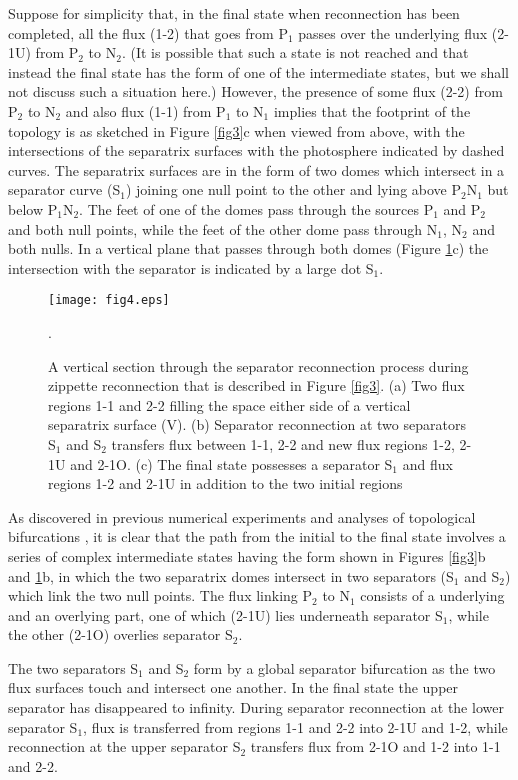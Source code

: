 \documentclass[10pt,namedreferneces]{SolarPhysics}
\begin{document}
\begin{article}
Suppose for simplicity that, in the final state when reconnection has been completed, all the flux (1-2) that goes from P$_1$ passes over the underlying flux (2-1U) from P$_2$ to N$_2$. (It is possible that such a state is not reached and that instead the final state has the form of one of the intermediate states, but we shall not discuss such a situation here.) However, the presence  of some flux (2-2) from P$_2$ to N$_2$ and also flux (1-1) from P$_1$ to N$_1$ implies that the footprint of the topology is as sketched in Figure \ref{fig3}c when viewed from above, with the intersections of the separatrix surfaces with the photosphere indicated by dashed curves. The separatrix surfaces are in the form of two domes which intersect in a separator curve (S$_1$) joining one null point to the other and lying above P$_2$N$_1$ but below P$_1$N$_2$. The feet of one of the domes pass through the sources P$_1$ and P$_2$ and both null points, while the feet of the other dome pass through N$_1$, N$_2$ and both nulls. In a vertical plane that passes through both domes (Figure \ref{fig4}c) the intersection with the separator is indicated by a large dot S$_1$.

\begin{figure}[h]
{\centering
 \texttt{[image: fig4.eps]}
\caption{A vertical section through the separator reconnection process during zippette reconnection that is described in Figure \ref{fig3}. (a) Two flux regions 1-1 and 2-2 filling the space either side of a vertical separatrix surface (V). (b) Separator reconnection at two separators S$_1$ and S$_2$ transfers flux between 1-1, 2-2 and new flux regions 1-2, 2-1U and 2-1O. (c) The final state possesses a separator S$_1$ and flux regions 1-2 and 2-1U in addition to the two initial regions}.
\label{fig4}}
\end{figure}

As discovered in previous numerical experiments \cite{parnell08a} and analyses of topological bifurcations \cite{brown99a,brown99b}, it is clear that the path from the initial to the final state involves a series of complex intermediate states having the form shown in Figures \ref{fig3}b and \ref{fig4}b, in which the two separatrix domes intersect in two separators (S$_1$ and S$_2$) which link the two null points. The flux linking P$_2$ to N$_1$ consists of a underlying and an overlying part, one of which (2-1U) lies underneath separator S$_1$, while the other (2-1O) overlies separator S$_2$.  

The two separators S$_1$ and S$_2$ form by a global separator bifurcation \cite{brown99a} as the two flux surfaces touch and intersect one another. In the final state the upper separator has disappeared to infinity.  During separator reconnection at the lower separator S$_1$, flux is transferred from regions 1-1 and 2-2 into 2-1U and 1-2, while reconnection at the upper separator S$_2$ transfers flux from 2-1O and 1-2 into 1-1 and 2-2.


\end{article}
\end{document}
